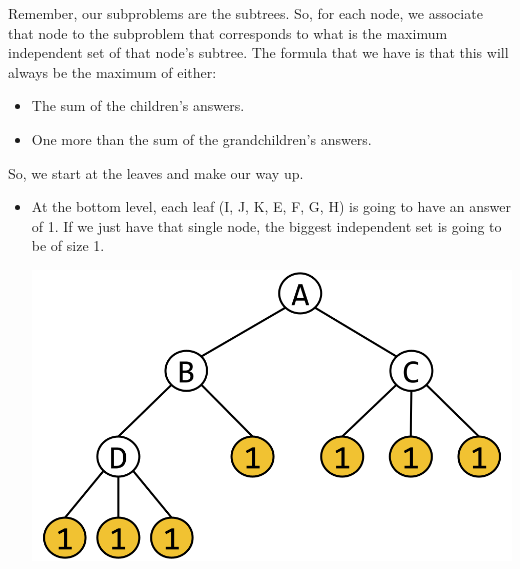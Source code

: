 \documentclass[letterpaper]{article}
\begin{document}
\begin{mdframed}[]
    Remember, our subproblems are the subtrees. So, for each node, we associate that node to the subproblem that corresponds to what is the maximum independent set of that node's subtree. The formula that we have is that this will always be the maximum of either: 
    \begin{itemize}
        \item The sum of the children's answers. 
        \item One more than the sum of the grandchildren's answers.
    \end{itemize}

    So, we start at the leaves and make our way up. 
    \begin{itemize}
        \item At the bottom level, each leaf (I, J, K, E, F, G, H) is going to have an answer of 1. If we just have that single node, the biggest independent set is going to be of size 1.
        \begin{center}
            \includegraphics[scale=0.2]{../assets/indep_set_ex_1.png}
        \end{center}


\end{itemize}
\end{mdframed}
\end{document}
